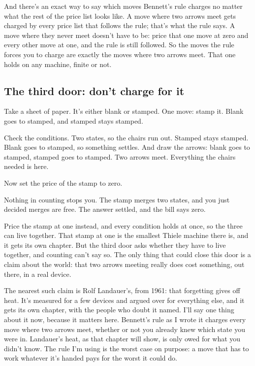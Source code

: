 \documentclass[11pt,twoside]{article}
\theoremstyle{thielethm}
\theoremstyle{thieledef}
\theoremstyle{thieledef}
\theoremstyle{thieledef}
\theoremstyle{thielethm}
\theoremstyle{thieleobs}
\theoremstyle{thielethm}
\begin{document}
And there's an exact way to say which moves Bennett's rule charges no matter what the rest of the price list looks like. A move where two arrows meet gets charged by every price list that follows the rule; that's what the rule says. A move where they never meet doesn't have to be: price that one move at zero and every other move at one, and the rule is still followed. So the moves the rule forces you to charge are exactly the moves where two arrows meet. That one holds on any machine, finite or not.

\subsection{The third door: don't charge for it}

Take a sheet of paper. It's either blank or stamped. One move: stamp it. Blank goes to stamped, and stamped stays stamped.

Check the conditions. Two states, so the chairs run out. Stamped stays stamped. Blank goes to stamped, so something settles. And draw the arrows: blank goes to stamped, stamped goes to stamped. Two arrows meet. Everything the chairs needed is here.

Now set the price of the stamp to zero.

Nothing in counting stops you. The stamp merges two states, and you just decided merges are free. The answer settled, and the bill says zero.

Price the stamp at one instead, and every condition holds at once, so the three can live together. That stamp at one is the smallest Thiele machine there is, and it gets its own chapter. But the third door asks whether they have to live together, and counting can't say so. The only thing that could close this door is a claim about the world: that two arrows meeting really does cost something, out there, in a real device.

The nearest such claim is Rolf Landauer's, from 1961: that forgetting gives off heat. It's measured for a few devices and argued over for everything else, and it gets its own chapter, with the people who doubt it named. I'll say one thing about it now, because it matters here. Bennett's rule as I wrote it charges every move where two arrows meet, whether or not you already knew which state you were in. Landauer's heat, as that chapter will show, is only owed for what you didn't know. The rule I'm using is the worst case on purpose: a move that has to work whatever it's handed pays for the worst it could do.
\end{document}
